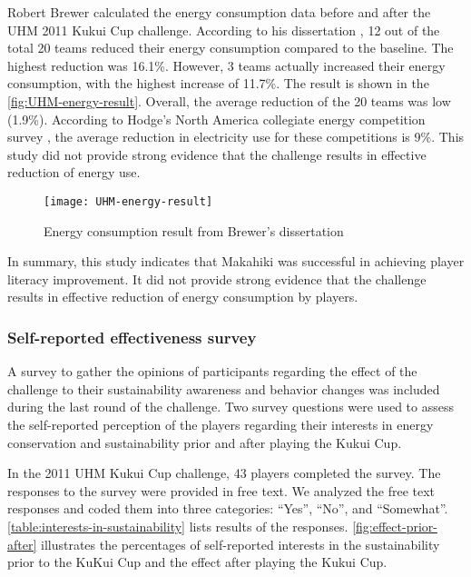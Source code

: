 Robert Brewer calculated the energy consumption data before and after the UHM 2011 Kukui Cup challenge. According to his dissertation \cite{csdl2-10-08}, 12 out of the total 20 teams reduced their energy
consumption compared to the baseline. The highest reduction was 16.1\%. However, 3 teams actually increased
their energy consumption, with the highest increase of 11.7\%. The result is shown in the \autoref{fig:UHM-energy-result}. Overall, the average reduction of the 20 teams was low (1.9\%).  According to Hodge's North America collegiate energy competition survey \cite{Hodge2010}, the average reduction in electricity use for these competitions is 9\%. This study did not provide strong evidence that the challenge results in effective reduction of energy use.

\begin{figure}[ht!]
  \center
  \texttt{[image: UHM-energy-result]}
  \caption{Energy consumption result from Brewer's dissertation \cite{csdl2-10-08}}
  \label{fig:UHM-energy-result}
\end{figure}

In summary, this study indicates that Makahiki was successful in achieving player literacy improvement. It did not provide strong evidence that the challenge results in effective reduction of energy consumption by players. 

\subsubsection{Self-reported effectiveness survey}
\label{sec:player-self-reported-effectiveness-result}

A survey to gather the opinions of participants regarding the effect of the challenge to their sustainability awareness and behavior changes was included during the last round of the challenge. 
Two survey questions were used to assess the self-reported perception of the players regarding their interests in energy conservation and sustainability prior and after playing the Kukui Cup. 

In the 2011 UHM Kukui Cup challenge, 43 players completed the survey. The responses to the survey were provided in free text. We analyzed the free text responses and coded them into three categories: ``Yes'', ``No'', and ``Somewhat''. \autoref{table:interests-in-sustainability} lists results of the responses. \autoref{fig:effect-prior-after} illustrates the percentages of self-reported interests in the sustainability prior to the KuKui Cup and the effect after playing the Kukui Cup.

